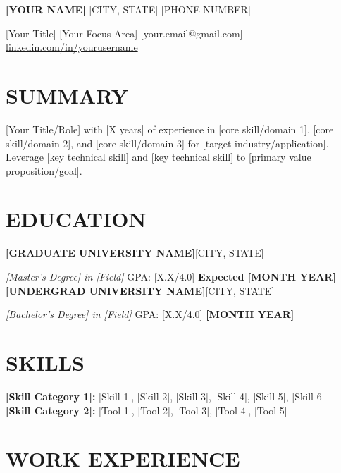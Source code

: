 \documentclass[10pt,letterpaper]{article}
\newenvironment{resumeentry}[2]{%
\vspace{1pt}\textbf{#1}\hfill {\small #2}\par
}{\vspace{0pt}}
\begin{document}
\pagestyle{empty}

\noindent
{\Large \textsc{\textbf{[YOUR NAME]}}} \hfill [CITY, STATE] \textbar{} [PHONE NUMBER]\par
\vspace{2pt}
[Your Title] \textbar{} [Your Focus Area] \hfill [your.email@gmail.com] \textbar{} \href{https://www.linkedin.com/in/yourusername}{linkedin.com/in/yourusername}
\vspace{8pt}

\section*{SUMMARY}
[Your Title/Role] with [X years] of experience in [core skill/domain 1], [core skill/domain 2], and [core skill/domain 3] for [target industry/application]. Leverage [key technical skill] and [key technical skill] to [primary value proposition/goal].

\section*{EDUCATION}
\begin{resumeentry}{[GRADUATE UNIVERSITY NAME]}{[CITY, STATE]}\end{resumeentry}
\textit{[Master's Degree] in [Field]} \textbar{} GPA: [X.X/4.0] \hfill \textbf{Expected [MONTH YEAR]}
\vspace{4pt}
\begin{resumeentry}{[UNDERGRAD UNIVERSITY NAME]}{[CITY, STATE]}\end{resumeentry}
\textit{[Bachelor's Degree] in [Field]} \textbar{} GPA: [X.X/4.0] \hfill \textbf{[MONTH YEAR]}

\section*{SKILLS}
\textbf{[Skill Category 1]:} [Skill 1], [Skill 2], [Skill 3], [Skill 4], [Skill 5], [Skill 6] \\
\textbf{[Skill Category 2]:} [Tool 1], [Tool 2], [Tool 3], [Tool 4], [Tool 5]

\section*{WORK EXPERIENCE}
\end{document}
